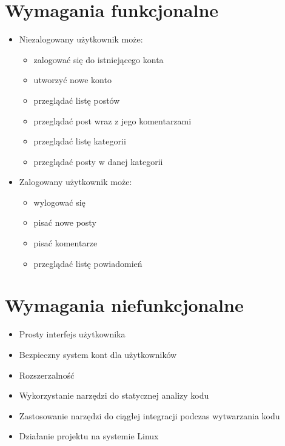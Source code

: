 \documentclass[declaration,shortabstract]{iithesis}
\begin{document}
\section{Wymagania funkcjonalne}

\begin{itemize}
    \item Niezalogowany użytkownik może: 
    \begin{itemize}
         \item zalogować się do istniejącego konta
         \item utworzyć nowe konto
         \item przeglądać listę postów
         \item przeglądać post wraz z jego komentarzami
         \item przeglądać listę kategorii
         \item przeglądać posty w danej kategorii
    \end{itemize}
    \item Zalogowany użytkownik może:
        \begin{itemize}
            \item wylogować się
            \item pisać nowe posty
            \item pisać komentarze
            \item przeglądać listę powiadomień
        \end{itemize}
\end{itemize}

{\color{red}
\section{Wymagania niefunkcjonalne}
\begin{itemize}
    \item Prosty interfejs użytkownika
    \item Bezpieczny system kont dla użytkowników
    \item Rozszerzalność
    \item Wykorzystanie narzędzi do statycznej analizy kodu
    \item Zastosowanie narzędzi do ciągłej integracji podczas wytwarzania kodu
    \item Działanie projektu na systemie Linux
    
\end{itemize}
}

\end{document}
